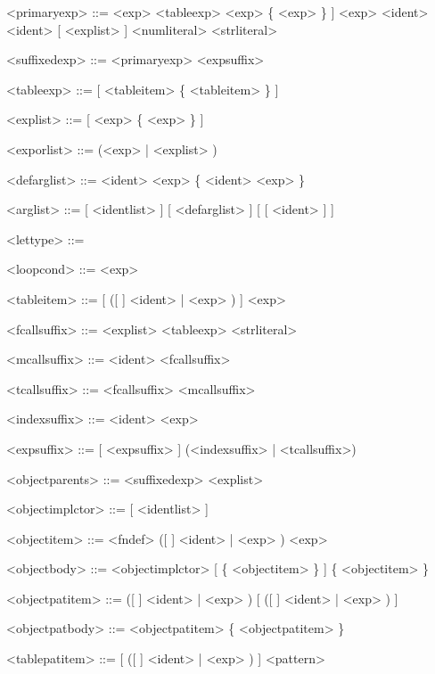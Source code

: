 \documentclass{article}
\newenvironment{bnf}
{
\begin{mdframed}
\begin{grammar}
}
{
\end{grammar}
\end{mdframed}
}
\begin{document}
\begin{bnf}
<primaryexp> ::= \lit{(} <exp> \lit{)}
    \alt <tableexp>
    \alt \lit{[} <exp> \{ \lit{,} <exp> \} ] \lit{]}
    \alt \lit{\$(} <exp> \lit{)}
    \alt \lit{\$} <ident>
    \alt <ident> [ \lit{!} \lit{(} <explist> \lit{)} ]
    \alt <numliteral>
    \alt <strliteral>
    \alt {}
    \alt {}
    \alt {}

<suffixedexp> ::= <primaryexp> <expsuffix>

<tableexp> ::= \lit{\{} [ <tableitem> \{ \lit{,} <tableitem> \} ] \lit{\}}

<explist> ::= [ <exp> \{ \lit{,} <exp> \} ]

<exporlist> ::= (<exp> | \lit{(} <explist> \lit{)})

<defarglist> ::= <ident> \lit{=} <exp> \{ \lit{,} <ident> \lit{=} <exp> \}

<arglist> ::= [ <identlist> ] [ <defarglist> ] [ [ <ident> ]  ]

<lettype> ::= 
    \alt {}

<loopcond> ::=  <exp>

<tableitem> ::= [ ([ \lit{\$} ] <ident> | \lit{\$(} <exp> \lit{)})
    \lit{:} ] <exp>

<fcallsuffix> ::= \lit{(} <explist> \lit{)}
    \alt <tableexp>
    \alt <strliteral>

<mcallsuffix> ::= \lit{:} <ident> <fcallsuffix>

<tcallsuffix> ::= <fcallsuffix>
    \alt <mcallsuffix>

<indexsuffix> ::=  <ident>
    \alt \lit{[} <exp> \lit{]}

<expsuffix> ::= [ <expsuffix> ] (<indexsuffix> | <tcallsuffix>)

<objectparents> ::= <suffixedexp>
    \alt \lit{(} <explist> \lit{)}

<objectimplctor> ::= \lit{[} [ <identlist> ] \lit{]}

<objectitem> ::= <fndef>
    \alt ([ \lit{\$} ] <ident> | \lit{\$(} <exp> \lit{)}) \lit{:} <exp>

<objectbody> ::= <objectimplctor> [  \{ <objectitem> \}  ]
    \alt {} \{ <objectitem> \} 

<objectpatitem> ::= ([ \lit{\$} ] <ident> | \lit{\$(} <exp> \lit{)})
    [ \lit{:} ([ \lit{\$} ] <ident> | \lit{\$(} <exp> \lit{)}) ]

<objectpatbody> ::= <objectpatitem> \{ \lit{,} <objectpatitem> \}

<tablepatitem> ::= [ ([ \lit{\$} ] <ident> | \lit{\$(} <exp> \lit{)})
    \lit{:} ] <pattern>


\end{bnf}
\end{document}
